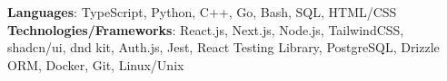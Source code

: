 \textbf{Languages}: TypeScript, Python, C++, Go, Bash, SQL, HTML/CSS \\
\textbf{Technologies/Frameworks}: React.js, Next.js, Node.js, TailwindCSS, shadcn/ui, dnd kit, Auth.js, Jest, React Testing Library, PostgreSQL, Drizzle ORM, Docker, Git, Linux/Unix